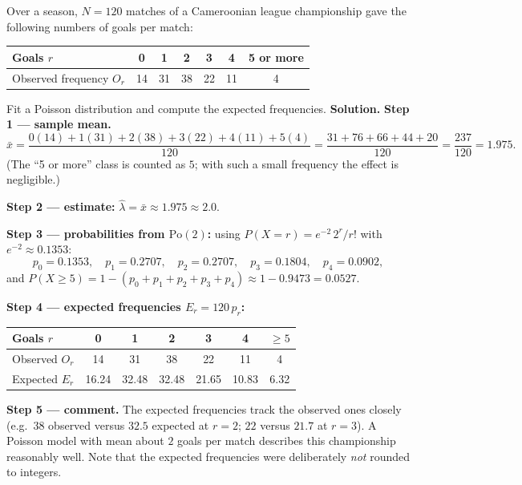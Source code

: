 \documentclass[11pt]{article}
\begin{document}
\begin{exoresolu}
Over a season, $N=120$ matches of a Cameroonian league championship gave the following numbers of goals per match:
\begin{center}
\begin{tabular}{|l|cccccc|}
\hline
Goals $r$ & 0 & 1 & 2 & 3 & 4 & 5 or more \\
\hline
Observed frequency $O_r$ & 14 & 31 & 38 & 22 & 11 & 4 \\
\hline
\end{tabular}
\end{center}
Fit a Poisson distribution and compute the expected frequencies.
\tcblower
\textbf{Solution.} \textbf{Step 1 — sample mean.}
\[
\bar{x}=\frac{0(14)+1(31)+2(38)+3(22)+4(11)+5(4)}{120}=\frac{31+76+66+44+20}{120}=\frac{237}{120}=1.975.
\]
(The ``5 or more'' class is counted as $5$; with such a small frequency the effect is negligible.)

\textbf{Step 2 — estimate:} $\hat\lambda=\bar{x}\approx 1.975\approx 2.0$.

\textbf{Step 3 — probabilities from $\mathrm{Po}(2)$:} using $P(X=r)=e^{-2}\,2^r/r!$ with $e^{-2}\approx 0.1353$:
\[
p_0=0.1353,\quad p_1=0.2707,\quad p_2=0.2707,\quad p_3=0.1804,\quad p_4=0.0902,
\]
and $P(X\geq 5)=1-(p_0+p_1+p_2+p_3+p_4)\approx 1-0.9473=0.0527$.

\textbf{Step 4 — expected frequencies $E_r=120\,p_r$:}
\begin{center}
\begin{tabular}{|l|cccccc|}
\hline
Goals $r$ & 0 & 1 & 2 & 3 & 4 & $\geq 5$ \\
\hline
Observed $O_r$ & 14 & 31 & 38 & 22 & 11 & 4 \\
\hline
Expected $E_r$ & 16.24 & 32.48 & 32.48 & 21.65 & 10.83 & 6.32 \\
\hline
\end{tabular}
\end{center}

\textbf{Step 5 — comment.} The expected frequencies track the observed ones closely (e.g.\ $38$ observed versus $32.5$ expected at $r=2$; $22$ versus $21.7$ at $r=3$). A Poisson model with mean about $2$ goals per match describes this championship reasonably well. Note that the expected frequencies were deliberately \emph{not} rounded to integers.
\end{exoresolu}
\end{document}
